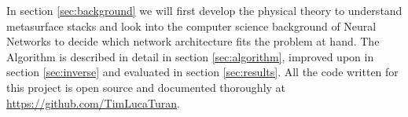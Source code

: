 \indent
In section \ref{sec:background} we will first develop the physical theory to understand metasurface stacks and look into the computer science background of Neural Networks to decide which network architecture fits the problem at hand. The Algorithm is described in detail in section \ref{sec:algorithm}, improved upon in section \ref{sec:inverse} and evaluated in section \ref{sec:results}.
All the code written for this project is open source and documented thoroughly at \url{https://github.com/TimLucaTuran}.
